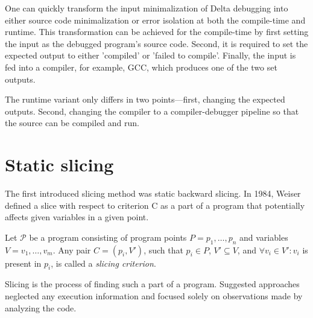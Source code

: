 One can quickly transform the input minimalization of Delta debugging into either source
code minimalization or error isolation at both the compile-time and runtime.
This transformation can be achieved for the compile-time by first setting the input
as the debugged program's source code. 
Second, it is required to set the expected
output to either 'compiled' or 'failed to compile'. 
Finally, the input is fed into a compiler, for example, GCC, which produces
one of the two set outputs. 

The runtime variant only differs in two points—first, changing the expected outputs. 
Second, changing the compiler to a compiler-debugger pipeline so that the source 
can be compiled and run.

\section{Static slicing}

The first introduced slicing method was static backward slicing. 
In 1984, Weiser defined a slice with respect to criterion C 
as a part of a program that potentially affects given variables in a given point. 

\begin{defn}\label{def02:5}
  Let $\mathcal{P}$ be a program consisting of program points 
  $P = p_1,\dots,p_n$ and variables $V = v_1,\dots,v_m$.
  Any pair $C = (p_i, V')$, such that $p_i \in P$, $V' \subseteq V$, and 
  $\forall v_i \in V': v_i$ is present in $p_i$, 
  is called a \emph{slicing criterion}.
\end{defn}


Slicing is the process of finding such a part of a program. 
Suggested approaches neglected any execution information and 
focused solely on observations made by analyzing the code.


